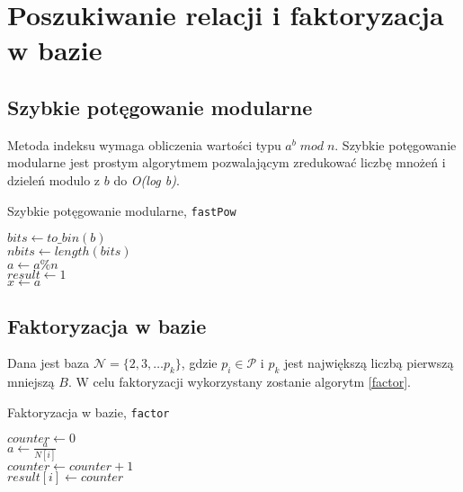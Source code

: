 \documentclass[]{article}
\begin{document}
\newpage
\section{Poszukiwanie relacji i faktoryzacja w bazie}
	\subsection{Szybkie potęgowanie modularne}
	Metoda indeksu wymaga obliczenia wartości typu $a^{b}\;{mod}\;n$.
	Szybkie potęgowanie modularne jest prostym algorytmem pozwalającym zredukować liczbę mnożeń i dzieleń modulo z $b$ do \textit{O(log b)}.
	\newline
	\begin{algorithm}[H]
		\caption{Szybkie potęgowanie modularne,  \texttt{fastPow}} 
		\label{szybkie_pot} 
		\BlankLine
		$bits \gets to\_bin(b)$\\
		$nbits \gets length(bits)$\\
		$a \gets a\%n$\\
		$result \gets 1$\\
		$x \gets a$\\
	\end{algorithm}
	
	\subsection{Faktoryzacja w bazie}
		Dana jest baza \(\mathcal{N} = \{2, 3, \dots p_k\}\), gdzie \(p_i \in \mathcal{P}\) i \(p_k\) jest największą liczbą pierwszą mniejszą \(B\). 
		W celu faktoryzacji wykorzystany zostanie algorytm \ref{factor}.
		\newline
		\begin{algorithm}[H]
			\SetAlgoLined
			\caption{Faktoryzacja w bazie, \texttt{factor}}
			\label{factor}
			{
				\(counter \gets 0\) \\
				{
					\(a \gets \frac{a}{N[i]}\) \\
					\(counter \gets counter + 1\) \\
				}
				\(result[i] \gets counter\) \\
			}
		\end{algorithm}
	
\end{document}
